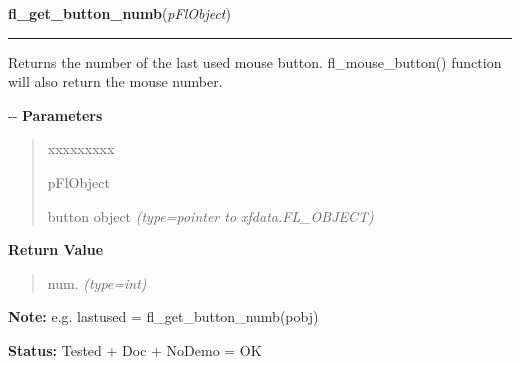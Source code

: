 \hspace{.8\funcindent}\begin{boxedminipage}{\funcwidth}

    \raggedright \textbf{fl\_get\_button\_numb}(\textit{pFlObject})

    \vspace{-1.5ex}

    \rule{\textwidth}{0.5\fboxrule}
\setlength{\parskip}{2ex}

Returns the number of the last used mouse button. fl\_mouse\_button()
function will also return the mouse number.

-{}-
\setlength{\parskip}{1ex}
      \textbf{Parameters}
      \vspace{-1ex}

      \begin{quote}
        \begin{Ventry}{xxxxxxxxx}

          \item[pFlObject]


button object
            {\it (type=pointer to xfdata.FL\_OBJECT)}

        \end{Ventry}

      \end{quote}

      \textbf{Return Value}
    \vspace{-1ex}

      \begin{quote}

num.
      {\it (type=int)}

      \end{quote}

\textbf{Note:} 
e.g. lastused = fl\_get\_button\_numb(pobj)


\textbf{Status:} 
Tested + Doc + NoDemo = OK


    \end{boxedminipage}

    \label{xformslib:flbasic:fl_set_object_shortcut}

    \vspace{0.5ex}

